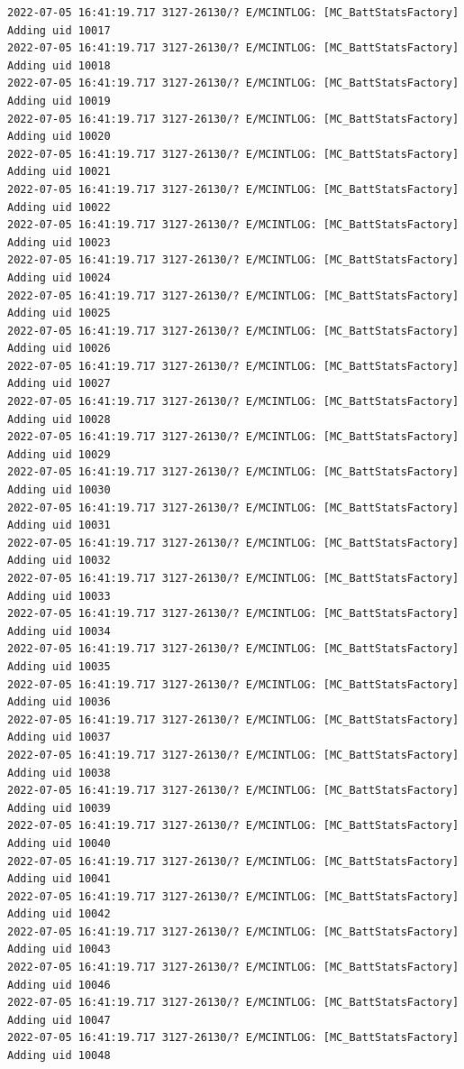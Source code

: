 \documentclass[a4paper,12pt]{book}
\begin{document}
\begin{lstlisting}
2022-07-05 16:41:19.717 3127-26130/? E/MCINTLOG: [MC_BattStatsFactory] Adding uid 10017
2022-07-05 16:41:19.717 3127-26130/? E/MCINTLOG: [MC_BattStatsFactory] Adding uid 10018
2022-07-05 16:41:19.717 3127-26130/? E/MCINTLOG: [MC_BattStatsFactory] Adding uid 10019
2022-07-05 16:41:19.717 3127-26130/? E/MCINTLOG: [MC_BattStatsFactory] Adding uid 10020
2022-07-05 16:41:19.717 3127-26130/? E/MCINTLOG: [MC_BattStatsFactory] Adding uid 10021
2022-07-05 16:41:19.717 3127-26130/? E/MCINTLOG: [MC_BattStatsFactory] Adding uid 10022
2022-07-05 16:41:19.717 3127-26130/? E/MCINTLOG: [MC_BattStatsFactory] Adding uid 10023
2022-07-05 16:41:19.717 3127-26130/? E/MCINTLOG: [MC_BattStatsFactory] Adding uid 10024
2022-07-05 16:41:19.717 3127-26130/? E/MCINTLOG: [MC_BattStatsFactory] Adding uid 10025
2022-07-05 16:41:19.717 3127-26130/? E/MCINTLOG: [MC_BattStatsFactory] Adding uid 10026
2022-07-05 16:41:19.717 3127-26130/? E/MCINTLOG: [MC_BattStatsFactory] Adding uid 10027
2022-07-05 16:41:19.717 3127-26130/? E/MCINTLOG: [MC_BattStatsFactory] Adding uid 10028
2022-07-05 16:41:19.717 3127-26130/? E/MCINTLOG: [MC_BattStatsFactory] Adding uid 10029
2022-07-05 16:41:19.717 3127-26130/? E/MCINTLOG: [MC_BattStatsFactory] Adding uid 10030
2022-07-05 16:41:19.717 3127-26130/? E/MCINTLOG: [MC_BattStatsFactory] Adding uid 10031
2022-07-05 16:41:19.717 3127-26130/? E/MCINTLOG: [MC_BattStatsFactory] Adding uid 10032
2022-07-05 16:41:19.717 3127-26130/? E/MCINTLOG: [MC_BattStatsFactory] Adding uid 10033
2022-07-05 16:41:19.717 3127-26130/? E/MCINTLOG: [MC_BattStatsFactory] Adding uid 10034
2022-07-05 16:41:19.717 3127-26130/? E/MCINTLOG: [MC_BattStatsFactory] Adding uid 10035
2022-07-05 16:41:19.717 3127-26130/? E/MCINTLOG: [MC_BattStatsFactory] Adding uid 10036
2022-07-05 16:41:19.717 3127-26130/? E/MCINTLOG: [MC_BattStatsFactory] Adding uid 10037
2022-07-05 16:41:19.717 3127-26130/? E/MCINTLOG: [MC_BattStatsFactory] Adding uid 10038
2022-07-05 16:41:19.717 3127-26130/? E/MCINTLOG: [MC_BattStatsFactory] Adding uid 10039
2022-07-05 16:41:19.717 3127-26130/? E/MCINTLOG: [MC_BattStatsFactory] Adding uid 10040
2022-07-05 16:41:19.717 3127-26130/? E/MCINTLOG: [MC_BattStatsFactory] Adding uid 10041
2022-07-05 16:41:19.717 3127-26130/? E/MCINTLOG: [MC_BattStatsFactory] Adding uid 10042
2022-07-05 16:41:19.717 3127-26130/? E/MCINTLOG: [MC_BattStatsFactory] Adding uid 10043
2022-07-05 16:41:19.717 3127-26130/? E/MCINTLOG: [MC_BattStatsFactory] Adding uid 10046
2022-07-05 16:41:19.717 3127-26130/? E/MCINTLOG: [MC_BattStatsFactory] Adding uid 10047
2022-07-05 16:41:19.717 3127-26130/? E/MCINTLOG: [MC_BattStatsFactory] Adding uid 10048

\end{lstlisting}
\end{document}
